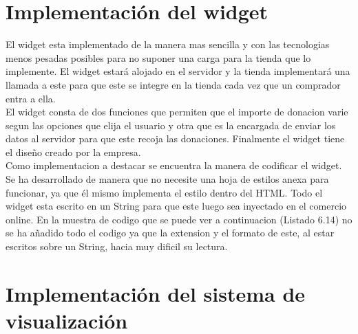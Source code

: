 
\section{Implementación del widget}
El widget esta implementado de la manera mas sencilla y con las tecnologias menos pesadas posibles para no suponer una carga para la tienda que lo implemente. El widget estará alojado en el servidor y la tienda implementará una llamada a este para que este se integre en la tienda cada vez que un comprador entra a ella.\\

El widget consta de dos funciones que permiten que el importe de donacion varie segun las opciones que elija el usuario y otra que es la encargada de enviar los datos al servidor para que este recoja las donaciones. Finalmente el widget tiene el diseño creado por la empresa.\\

Como implementacion a destacar se encuentra la manera de codificar el widget. Se ha desarrollado de manera que no necesite una hoja de estilos anexa para funcionar, ya que él mismo implementa el estilo dentro del HTML. Todo el widget esta escrito en un String para que este luego sea inyectado en el comercio online. En la muestra de codigo que se puede ver a continuacion (Listado 6.14) no se ha añadido todo el codigo ya que la extension y el formato de este, al estar escritos sobre un String, hacia muy dificil su lectura.


\section{Implementación del sistema de visualización}
